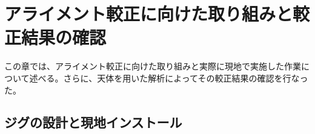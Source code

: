

\chapter{アライメント較正に向けた取り組みと較正結果の確認}
\label{chapter4_2}
この章では、アライメント較正に向けた取り組みと実際に現地で実施した作業について述べる。さらに、天体を用いた解析によってその較正結果の確認を行なった。
\section{ジグの設計と現地インストール}

